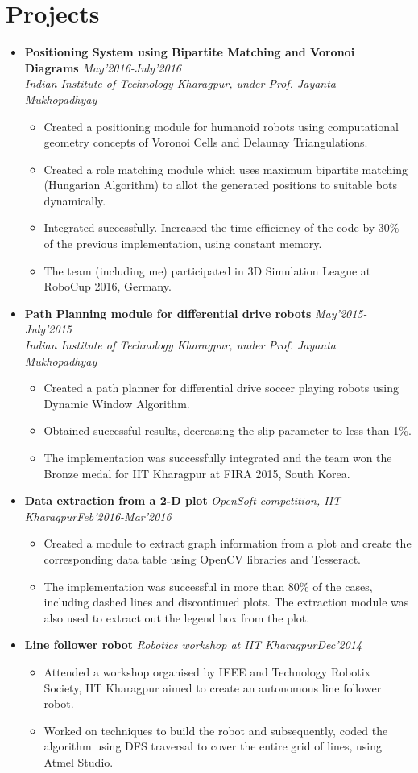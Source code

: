 \documentclass[11pt,a4paper]{moderncv}
\newcommand{\experience}[4]{
  \vspace{0.1cm}
\item \textbf{\large{#1}} \textit{#2}\hfill\textit{#3}
  \begin{itemize}[leftmargin=*]
    \setlength\itemsep{0em} #4
  \end{itemize}
}
\newcommand{\experiencetwo}[4]{
  \vspace{0.1cm}
\item \textbf{\large{#1}} \hfill\textit{#3}\\\textit{#2}
  \begin{itemize}[leftmargin=*]
    \setlength\itemsep{0em} #4
  \end{itemize}
}
\begin{document}
\section*{Projects}
\begin{itemize}
  \setlength\itemsep{0.5em}

  \experiencetwo{Positioning System using Bipartite Matching and Voronoi Diagrams}{Indian Institute of Technology Kharagpur, under Prof. Jayanta Mukhopadhyay}{May'2016-July'2016}{
   \item Created a positioning module for humanoid robots using computational geometry concepts of Voronoi Cells and Delaunay Triangulations.
  \item Created a role matching module which uses maximum bipartite matching (Hungarian Algorithm) to allot the generated positions to suitable bots dynamically.  
  \item Integrated successfully. Increased the time efficiency of the code
    by 30\% of the previous implementation, using constant memory. 
  \item The team (including me) participated in 3D Simulation League at RoboCup 2016, Germany.
  }
  
  \experiencetwo{Path Planning module for differential drive robots}{Indian Institute of Technology Kharagpur, under Prof. Jayanta Mukhopadhyay}{May'2015-July'2015}{
  \item Created a path planner for differential drive soccer playing robots 
    using Dynamic Window Algorithm.
  \item Obtained successful results, decreasing the slip parameter to less
    than 1\%.  
  \item The implementation was successfully integrated and the team won the 
    Bronze medal for IIT Kharagpur at FIRA 2015, South Korea.
  }

  \experience{Data extraction from a 2-D plot}{OpenSoft competition, IIT Kharagpur}{Feb'2016-Mar'2016}{
  \item Created a module to extract graph information from a plot and create the corresponding data table using OpenCV libraries and Tesseract.
  \item The implementation was successful in more than 80\% of the cases, including dashed lines and discontinued plots. The extraction module was also used to extract out the legend box from the plot.
  }

  \experience{Line follower robot}{Robotics workshop at IIT Kharagpur}{Dec'2014}{
  \item Attended a workshop organised by IEEE and Technology Robotix Society, IIT Kharagpur aimed to create an autonomous line follower robot.
  \item Worked on techniques to build the robot and subsequently, coded the algorithm using DFS traversal to cover the entire grid of lines, using Atmel Studio.
  }


\end{itemize}
\end{document}
